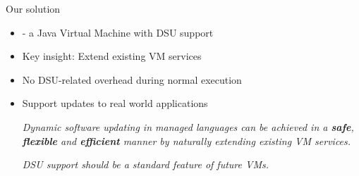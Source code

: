 \begin{frame}{Our solution}%
\begin{itemize}
\item \DSU{} - a Java Virtual Machine with DSU support
\item Key insight: Extend existing VM services
\item No DSU-related overhead during normal execution
\item Support updates to real world applications
\begin{block}{}
\emph{Dynamic software updating in managed languages can be achieved in a
{\bf safe}, {\bf flexible} and {\bf efficient} manner by naturally extending existing VM
services.}
\end{block}

\begin{block}{}
\emph{DSU support should be a standard feature of future VMs.}
\end{block}
\end{itemize}
\end{frame}

% 
